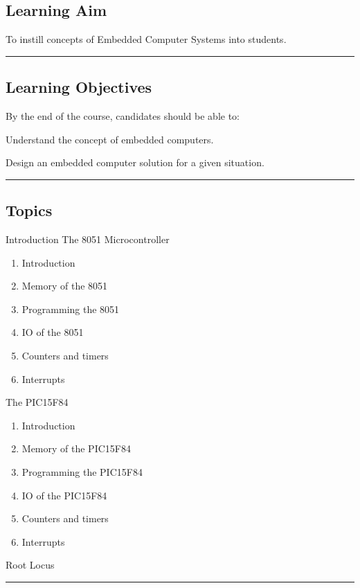 \subsection*{Learning Aim}
To instill concepts of Embedded Computer Systems into students.
\vspace{2ex} \hrule\vspace{2ex}

\subsection*{Learning Objectives}
By the end of the course, candidates should be able to:
\begin{outline}
    \1      Understand the concept of embedded computers.

    \1  	Design an embedded computer solution for a given situation.

\end{outline}
\vspace{2ex}\hrule\vspace{2ex}

\subsection*{Topics}
\begin{outline}
    \1 Introduction
    \1 The 8051 Microcontroller
    \begin{enumerate}
        \item Introduction
        \item Memory of the 8051
        \item Programming the 8051
        \item IO of the 8051
        \item Counters and timers
        \item Interrupts
    \end{enumerate}
    \1 The PIC15F84
    \begin{enumerate}
        \item Introduction
        \item Memory of the PIC15F84
        \item Programming the PIC15F84
        \item IO of the PIC15F84
        \item Counters and timers
        \item Interrupts
    \end{enumerate}
    \1 Root Locus
\end{outline}
\vspace{2ex} \hrule\vspace{2ex}

